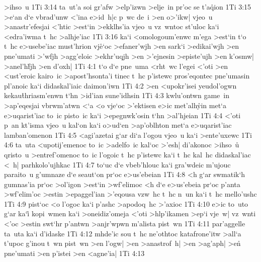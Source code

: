 >ihso~u\bibvsend
\vs 1Ti 3:14
ta~ut'a
soi
gr'afw
>elp'izwn
>elje~in
pr'oc
se
t'a\r{q}ion\bibvsend
{}
\vs 1Ti 3:15
>e`an
d`e
vbrad'unw
<'ina
e>id~h|c
p~wc
de~i
>en
o>'ikw|
vjeo~u
>anastr'efesjai
<'htic
>est`in
>ekklhs'ia
vjeo~u
vz~wntoc
st'uloc
ka`i
<edra'iwma
t~hc
>alhje'iac\bibvsend
\vs 1Ti 3:16
ka`i
<omologoum'enwc
m'ega
>est`in
t`o
t~hc
e>usebe'iac
must'hrion
vj\r{e}`oc
>efaner'wjh
>en
sark`i
>edikai'wjh
>en
pne'umati
>'wfjh
>agg'eloic
>ekhr'uqjh
>en
>'ejnesin
>episte'ujh
>en
k'osmw|
>anel'h\r{f}jh
>en
d'oxh|\bibvsend
\vs 1Ti 4:1
t`o
d`e
pne~uma
<rht~wc
l'egei
<'oti
>en
<ust'eroic
kairo~ic
>apost'hsonta'i
tinec
t~hc
p'istewc
pros'eqontec
pne'umasin
pl'anoic
ka`i
didaskal'iaic
daimon'iwn\bibvsend
\vs 1Ti 4:2
>en
<upokr'isei
yeudol'ogwn
ke\-kau\r{t}h\-ri\-as\-m'e\-nwn
t`hn
>id'ian
sune'idhsin\bibvsend
\vs 1Ti 4:3
kwlu'ontwn
game~in
>ap'eqesjai
vbrwm'atwn
<`a
<o
vje`oc
>'ektisen
e>ic
met'alh\r{y}in
met`a
e>uqarist'iac
to~ic
pisto~ic
ka`i
>epegnwk'osin
t`hn
>al'hjeian\bibvsend
\vs 1Ti 4:4
<'oti
p~an
kt'isma
vjeo~u
kal`on
ka`i
o>ud`en
>ap'oblhton
met`a
e>uqarist'iac
lamban'omenon\bibvsend
\vs 1Ti 4:5
<agi'azetai
g`ar
di`a
l'ogou
vjeo~u
ka`i
>ente'uxewc\bibvsend
\vs 1Ti 4:6
ta~uta
<upotij'emenoc
to~ic
>adelfo~ic
kal`oc
>'esh|
di'akonoc
>ihso~u\r{}
qristo~u
>entref'omenoc
to~ic
l'ogoic
t~hc
p'istewc
ka`i
t~hc
kal~hc
didaskal'iac
<~h|
parhkolo'ujhkac\bibvsend
\vs 1Ti 4:7
to`uc
d`e
vbeb'hlouc
ka`i
gra'wdeic
m'ujouc
paraito~u
g'umnaze
d`e
seaut`on
pr`oc
e>us'ebeian\bibvsend
\vs 1Ti 4:8
<h
g`ar
swmatik`h
gumnas'ia
pr`oc
>ol'igon
>est`in
>wf'elimoc
<h
d`e
e>us'ebeia
pr`oc
p'anta
>wf'elim'oc
>estin
>epaggel'ian
>'eqousa
vzw~hc
t~hc
n~un
ka`i
t~hc
mello'ushc\bibvsend
\vs 1Ti 4:9
pist`oc
<o
l'ogoc
ka`i
p'ashc
>apodoq~hc
>'axioc\bibvsend
\vs 1Ti 4:10
e>ic
to~uto
g`ar
ka`i\r{}
kopi~wmen
ka`i
>oneidiz'omeja
<'oti
>hlp'ikamen
>ep`i
vje~w|
vz~wnti
<'oc
>estin
swt`hr
p'antwn
>anjr'wpwn
m'alista
pist~wn\bibvsend
\vs 1Ti 4:11
par'aggelle
ta~uta
ka`i
d'idaske\bibvsend
\vs 1Ti 4:12
mhde'ic
sou
t~hc
ne'othtoc
katafrone'itw
>all`a
t'upoc
g'inou
t~wn
pist~wn
>en
l'ogw|
>en
>anastrof~h|
>en
>ag'aph|
>en\r{}
pne'umati
>en
p'istei
>en
<agne'ia|\bibvsend
\vs 1Ti 4:13
